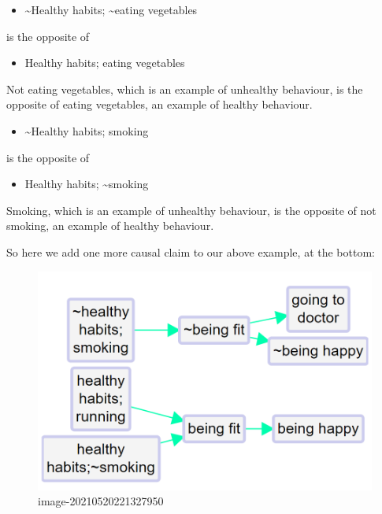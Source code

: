 \documentclass[
]{book}
\providecommand{\tightlist}{%
  \setlength{\itemsep}{0pt}\setlength{\parskip}{0pt}}
\begin{document}
\begin{itemize}
\tightlist
\item
  \textasciitilde Healthy habits; \textasciitilde eating vegetables
\end{itemize}

is the opposite of

\begin{itemize}
\tightlist
\item
  Healthy habits; eating vegetables
\end{itemize}

Not eating vegetables, which is an example of unhealthy behaviour, is the opposite of eating vegetables, an example of healthy behaviour.

\begin{itemize}
\tightlist
\item
  \textasciitilde Healthy habits; smoking
\end{itemize}

is the opposite of

\begin{itemize}
\tightlist
\item
  Healthy habits; \textasciitilde smoking
\end{itemize}

Smoking, which is an example of unhealthy behaviour, is the opposite of not smoking, an example of healthy behaviour.

So here we add one more causal claim to our above example, at the bottom:

\begin{figure}
\centering
\includegraphics{_assets/image-20210520221327950.png}
\caption{image-20210520221327950}
\end{figure}
\end{document}
